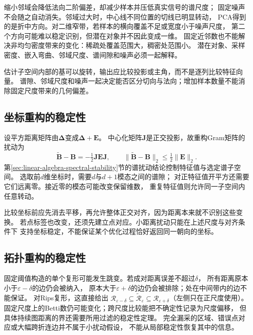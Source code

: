 缩小邻域会降低法向二阶偏差，却减少样本并压低真实信号的谱尺度；
固定噪声不会随之自动消失。邻域过大时，中心线不同位置的切线已明显转动，
PCA得到的是折中方向。对二维窄带，若样本的横向覆盖不足或宽度小于噪声尺度，
第二个方向可能难以稳定识别，但潜在对象并不因此变成一维。
固定近邻数也不能解决非均匀密度带来的变化：稀疏处覆盖范围大，稠密处范围小。
潜在对象、采样密度、嵌入弯曲、邻域尺度、谱间隙和噪声必须一起解释。


估计子空间内部的基可以旋转，输出应比较投影或主角，而不是逐列比较特征向量。
谱隙、邻域尺度和噪声一起决定能否区分切向与法向；增加样本数量不能消除固定尺度带来的几何偏差。

\subsection{坐标重构的稳定性}
\label{sec:geometry-coordinate-reconstruction-stability}

设平方距离矩阵由$\bm\Delta$变成$\bm\Delta+\bm E$。
中心化矩阵$\bm J$是正交投影，故重构Gram矩阵的扰动为
\[
 \widetilde{\bm B}-\bm B=-\tfrac12\bm J\bm E\bm J,\qquad
 \lVert\widetilde{\bm B}-\bm B\rVert_2\leq\tfrac12\lVert\bm E\rVert_2.
\]
第\ref{sec:linear-algebra-spectral-stability}节的谱扰动结论控制特征值与选定谱子空间。
选取前$d$维坐标时，需要$d$与$d+1$模态之间的谱隙；
对正特征值开平方还需要它们远离零。接近零的模态可能改变保留维数，
重复特征值则允许同一子空间内任意转动。

比较坐标前应先消去平移，再允许整体正交对齐，因为距离本来就不识别这些变换。
若点标签也改变，还须先建立点对应。小距离扰动只能在上述尺度与对齐条件下
支持坐标稳定，不能保证某个优化过程恰好返回同一朝向的坐标。

\subsection{拓扑重构的稳定性}
\label{sec:geometry-topology-reconstruction-stability}

固定阈值构造的单个复形可能发生跳变。若成对距离误差不超过$\delta$，
所有距离原本小于$\varepsilon-\delta$的边仍会被纳入，
原本大于$\varepsilon+\delta$的边仍会被排除；处在中间带内的边不能保证。
对Rips复形，这直接给出
$\mathcal R_{\varepsilon-\delta}\subseteq\widetilde{\mathcal R}_{\varepsilon}
\subseteq\mathcal R_{\varepsilon+\delta}$（左侧只在正尺度使用）。
固定尺度上的Betti数仍可能变化；跨尺度比较能把不确定性记录为尺度偏移，
但具体持续图距离的界还需要所用过滤的稳定性定理。
完全漏采的区域、错误点对应或大幅跨折连边并不属于小扰动假设，
不能从局部稳定性恢复其中的信息。

